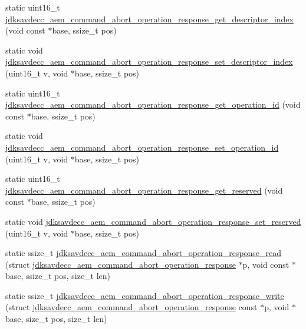\begin{DoxyCompactItemize}
\item 
static uint16\+\_\+t \hyperlink{group__command__abort__operation__response_gad547fac1117b0eca2b773459c8469c65}{jdksavdecc\+\_\+aem\+\_\+command\+\_\+abort\+\_\+operation\+\_\+response\+\_\+get\+\_\+descriptor\+\_\+index} (void const $\ast$base, ssize\+\_\+t pos)
\item 
static void \hyperlink{group__command__abort__operation__response_ga98a8c72afd9d5b31ee83ded580a050f1}{jdksavdecc\+\_\+aem\+\_\+command\+\_\+abort\+\_\+operation\+\_\+response\+\_\+set\+\_\+descriptor\+\_\+index} (uint16\+\_\+t v, void $\ast$base, ssize\+\_\+t pos)
\item 
static uint16\+\_\+t \hyperlink{group__command__abort__operation__response_gaaf7e0679749a03c645b8b04a551482a8}{jdksavdecc\+\_\+aem\+\_\+command\+\_\+abort\+\_\+operation\+\_\+response\+\_\+get\+\_\+operation\+\_\+id} (void const $\ast$base, ssize\+\_\+t pos)
\item 
static void \hyperlink{group__command__abort__operation__response_gaf710db03f2c006b76a1329c8d812011e}{jdksavdecc\+\_\+aem\+\_\+command\+\_\+abort\+\_\+operation\+\_\+response\+\_\+set\+\_\+operation\+\_\+id} (uint16\+\_\+t v, void $\ast$base, ssize\+\_\+t pos)
\item 
static uint16\+\_\+t \hyperlink{group__command__abort__operation__response_ga62836500d8ab9b6dc1b4a34a39a57e1f}{jdksavdecc\+\_\+aem\+\_\+command\+\_\+abort\+\_\+operation\+\_\+response\+\_\+get\+\_\+reserved} (void const $\ast$base, ssize\+\_\+t pos)
\item 
static void \hyperlink{group__command__abort__operation__response_gab04194ff2fb4fe28cd2db541b03e10f3}{jdksavdecc\+\_\+aem\+\_\+command\+\_\+abort\+\_\+operation\+\_\+response\+\_\+set\+\_\+reserved} (uint16\+\_\+t v, void $\ast$base, ssize\+\_\+t pos)
\item 
static ssize\+\_\+t \hyperlink{group__command__abort__operation__response_ga3dae0568ebc07d7f4e95212f87ebeb13}{jdksavdecc\+\_\+aem\+\_\+command\+\_\+abort\+\_\+operation\+\_\+response\+\_\+read} (struct \hyperlink{structjdksavdecc__aem__command__abort__operation__response}{jdksavdecc\+\_\+aem\+\_\+command\+\_\+abort\+\_\+operation\+\_\+response} $\ast$p, void const $\ast$base, ssize\+\_\+t pos, size\+\_\+t len)
\item 
static ssize\+\_\+t \hyperlink{group__command__abort__operation__response_ga799f8fe0910acbf69d8083664feae4af}{jdksavdecc\+\_\+aem\+\_\+command\+\_\+abort\+\_\+operation\+\_\+response\+\_\+write} (struct \hyperlink{structjdksavdecc__aem__command__abort__operation__response}{jdksavdecc\+\_\+aem\+\_\+command\+\_\+abort\+\_\+operation\+\_\+response} const $\ast$p, void $\ast$base, size\+\_\+t pos, size\+\_\+t len)
\end{DoxyCompactItemize}


